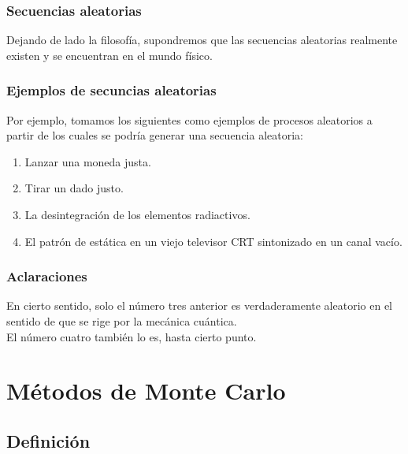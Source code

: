 \documentclass[12pt]{beamer}
\begin{document}
\begin{frame}
\frametitle{Secuencias aleatorias}
Dejando de lado la filosofía, supondremos que las secuencias aleatorias realmente existen y se encuentran en el mundo físico.
\end{frame}
\begin{frame}
\frametitle{Ejemplos de secuncias aleatorias}
Por ejemplo, tomamos los siguientes como ejemplos de procesos aleatorios a partir de los cuales se podría generar una secuencia aleatoria:
\pause
{}
\begin{enumerate}[<+->]
\item Lanzar una moneda justa.
\item Tirar un dado justo.
\item La desintegración de los elementos radiactivos.
\item El patrón de estática en un viejo televisor CRT sintonizado en un canal vacío.
\end{enumerate}
\end{frame}
\begin{frame}
\frametitle{Aclaraciones}
En cierto sentido, solo el número tres anterior es verdaderamente aleatorio en el sentido de que se rige por la mecánica cuántica.
\\
\bigskip
\pause
El número cuatro también lo es, hasta cierto punto.
\end{frame}

\section{Métodos de Monte Carlo}
\subsection{Definición}
\end{document}
